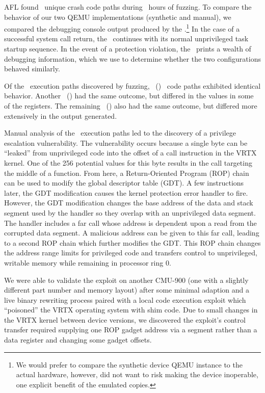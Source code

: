 AFL found \cmuNumPathsDiscovered\ unique crash code paths during \cmuHoursFuzzed\ hours of fuzzing.
To compare the behavior of our two QEMU implementations (synthetic and manual), we compared the debugging console output produced by the \cmutarg.\footnote{
We would prefer to compare the synthetic device QEMU instance to the actual hardware, however, did not want to risk making the device inoperable, one explicit benefit of the emulated copies.
}
In the case of a successful system call return, the \cmutarg\ continues with its normal unprivileged task startup sequence.
In the event of a protection violation, the \cmutarg\ prints a wealth of debugging information, which we use to determine whether the two configurations behaved similarly.

Of the \cmuNumPathsDiscovered\ execution paths discovered by fuzzing, \cmuExactOutputMatches\ (\cmuPercentExactOutputToPaths) \ code paths exhibited identical behavior.
Another \cmuNearExactOutputMatches\ (\cmuPercentNearOutputToPaths) had the same outcome, but differed in the values in some of the registers.
The remaining \cmuNonExactOutputMatches\ (\cmuPercentNonExactOutputToPaths) also had the same outcome, but differed more extensively in the output generated.

Manual analysis of the \cmuNumPathsDiscovered\ execution paths led to
the discovery of a privilege escalation vulnerability.  The
vulnerability occurs because a single byte can be ``leaked'' from
unprivileged code into the offset of a call instruction in the VRTX
kernel.  One of the 256 potential values for this byte results in the
call targeting the middle of a function.  From here, a Return-Oriented
Program (ROP) chain can be used to modify the global descriptor table
(GDT).  A few instructions later, the GDT modification causes the
kernel protection error handler to fire.  However, the GDT
modification changes the base address of the data and stack segment
used by the handler so they overlap with an unprivileged data segment.
The handler includes a far call whose address is dependent upon a read
from the corrupted data segment.  A malicious address can be given to
this far call, leading to a second ROP chain which further modifies
the GDT.  This ROP chain changes the address range limits for
privileged code and transfers control to unprivileged, writable memory
while remaining in processor ring 0.

We were able to validate the exploit on another CMU-900 (one with a slightly different part number and
memory layout) after some minimal adaption and a live binary rewriting process paired with a local code execution exploit which ``poisoned'' the VRTX operating system with shim code. 
Due to small changes in the VRTX kernel between device versions, we discovered
the exploit's control transfer required supplying one ROP gadget address via a
segment rather than a data register and changing some gadget offsets.

